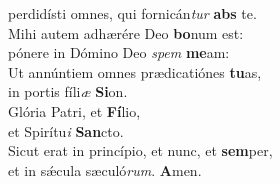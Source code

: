 \evenverse perdidísti omnes, qui fornicán\textit{tur} \textbf{abs} te.\\
\oddverse Mihi autem adhærére Deo \textbf{bo}num est:~\*\\
\oddverse pónere in Dómino Deo \textit{spem} \textbf{me}am:\\
\evenverse Ut annúntiem omnes prædicatiónes \textbf{tu}as,~\*\\
\evenverse in portis fíli\textit{æ} \textbf{Si}on.\\
\oddverse Glória Patri, et \textbf{Fí}lio,~\*\\
\oddverse et Spirítu\textit{i} \textbf{San}cto.\\
\evenverse Sicut erat in princípio, et nunc, et \textbf{sem}per,~\*\\
\evenverse et in sǽcula sæculó\textit{rum}. \textbf{A}men.\\
